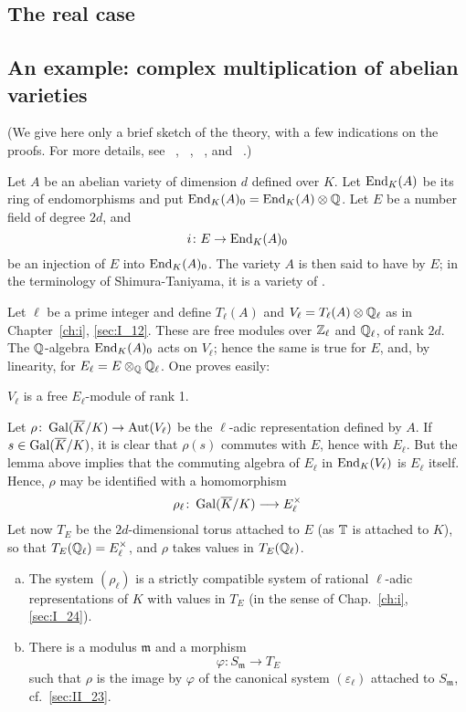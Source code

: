 \subsection{The real case}

\subsection{An example: complex multiplication of abelian varieties}
(We give here only a brief sketch of the theory, with a few indications on the
proofs. For more details, see \citeauthor{34}~\cite{34},
\citeauthor{35}~\cite{35}, \citeauthor{41}~\cite{41}, \cite{42} and
\citeauthor{32}~\cite{32}.)

Let $A$ be an abelian variety of dimension $d$ defined over $K$.
Let $\operatorname{End}_K(A)$ be its ring of endomorphisms and put
$\operatorname{End}_K(A)_0 = \operatorname{End}_K(A) \otimes \mathbb{Q}$.
Let $E$ be a number field of degree $2d$, and
\dpage
\[
	i \colon E \to \operatorname{End}_K(A)_0
\]
be an injection of $E$ into $\operatorname{End}_K(A)_0$. The variety $A$ is then said to
have  by $E$; in the terminology of
Shimura-Taniyama, it is a variety of .

Let $\ell$ be a prime integer and define $T_\ell(A)$ and $V_\ell = T_\ell(A)
\otimes \mathbb{Q}_\ell$ as in Chapter~\ref{ch:i}, \ref{sec:I_12}. These are free
modules over $\mathbb{Z}_\ell$ and $\mathbb{Q}_\ell$, of rank $2d$. The $\mathbb{Q}$-algebra
$\operatorname{End}_K(A)_0$ acts on $V_\ell$; hence the same is true for $E$, and, by
linearity, for $E_\ell = E \otimes_{\mathbb{Q}} \mathbb{Q}_\ell$. One proves easily:

\begin{lem}
	$V_\ell$ is a free $E_\ell$-module of rank 1.
\end{lem}

Let $\rho\colon \operatorname{Gal}(\overline{K}/K) \to \operatorname{Aut}(V_\ell)$ be the $\ell$-adic
representation defined by $A$. If $s \in \operatorname{Gal}(\overline{K}/K)$, it is clear that
$\rho(s)$ commutes with $E$, hence with $E_\ell$. But the lemma above implies
that the commuting algebra of $E_\ell$ in $\operatorname{End}_K(V_\ell)$ is $E_\ell$ itself.
Hence, $\rho$ may be identified with a homomorphism
\[
	\rho_\ell\colon \operatorname{Gal}(\overline{K}/K) \longrightarrow E^\times_\ell
\]
Let now $T_E$ be the $2d$-dimensional torus attached to $E$ (as $\mathbb{T}$ is
attached to $K$), so that $T_E(\mathbb{Q}_\ell) = E_\ell^\times$, and $\rho$ takes
values in $T_E(\mathbb{Q}_\ell)$.

\begin{thm}\label{thm:II_28_1}
\begin{enumerate}[(a)]
\item\label{thm:II_28_1a}
	The system $(\rho_\ell)$ is a strictly compatible system of rational
	$\ell$-adic representations of $K$ with values in $T_E$ (in the sense
	\dpage
	of Chap.~\ref{ch:i}, \ref{sec:I_24}).
\item\label{thm:II_28_1b}
	There is a modulus $\mathfrak{m}$ and a morphism
	\[
		\varphi \colon S_{\mathfrak{m}} \longrightarrow T_E
	\]
	such that $\rho$ is the image by $\varphi$ of the canonical system
	$(\varepsilon_\ell)$ attached to $S_{\mathfrak{m}}$, cf.\ 
	\ref{sec:II_23}.
\end{enumerate}
\end{thm}

